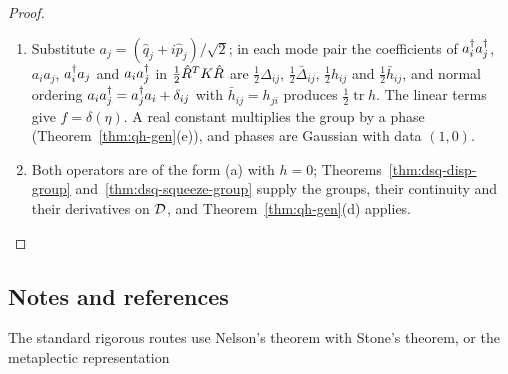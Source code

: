 \begin{vetqenv}
\begin{proof}
\begin{enumerate}
\item[(a)] Substitute $a_j=(\hat q_j+i\hat p_j)/\sqrt2$; in each mode pair the coefficients of $a_i^{\dagger} a_j^{\dagger}$, $a_ia_j$, $a_i^{\dagger} a_j$ and $a_ia_j^{\dagger}$ in
$\tfrac12\hat R^TK\hat R$ are $\tfrac12\Delta_{ij}$, $\tfrac12\bar\Delta_{ij}$, $\tfrac12h_{ij}$ and $\tfrac12\bar h_{ij}$, and normal ordering
$a_ia_j^{\dagger}=a_j^{\dagger} a_i+\delta_{ij}$ with $\bar h_{ij}=h_{ji}$ produces $\tfrac12\operatorname{tr}h$. The linear terms give $f=\delta(\eta)$. A real constant
multiplies the group by a phase (Theorem~\ref{thm:qh-gen}(e)), and phases are Gaussian with data $(1,0)$.
\item[(b)] Both operators are of the form (a) with $h=0$; Theorems~\ref{thm:dsq-disp-group} and~\ref{thm:dsq-squeeze-group}
supply the groups, their continuity and their derivatives on $\mathcal D$, and Theorem~\ref{thm:qh-gen}(d) applies.\qedhere
\end{enumerate}
\end{proof}

\subsection*{Notes and references}

 The standard rigorous routes use Nelson's theorem with Stone's theorem, or the metaplectic
representation~\cite[]{folland}
\end{vetqenv}
